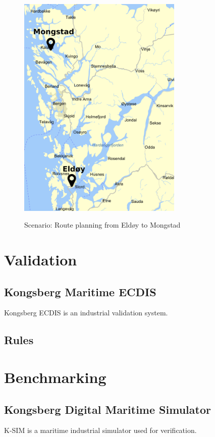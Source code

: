 \begin{figure}[H]
\centering
\includegraphics[width=0.7\textwidth]{fig/scenario}
\label{fig:scenario}
\caption{Scenario: Route planning from Eldøy to Mongstad}
\label{fig:scenario}
\end{figure}


\section{Validation}
\subsection{Kongsberg Maritime ECDIS}
Kongsberg ECDIS is an industrial validation system.

\subsection{Rules}


\section{Benchmarking}
\subsection{Kongsberg Digital Maritime Simulator}
K-SIM is a maritime industrial simulator used for verification. 

